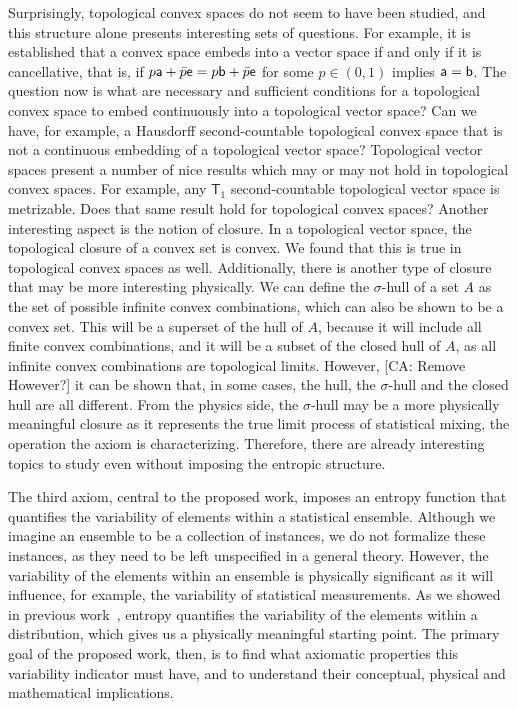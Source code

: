 Surprisingly, topological convex spaces do not seem to have been studied, and this structure alone presents interesting sets of questions.  For example, it is established that a convex space embeds into a vector space if and only if it is cancellative, that is, if $p \ens[a] + \bar{p} \ens = p \ens[b] + \bar{p} \ens$ for some $p \in (0,1)$ implies $\ens[a] = \ens[b]$. The question now is what are necessary and sufficient conditions for a topological convex space to embed continuously into a topological vector space? Can we have, for example, a Hausdorff second-countable topological convex space that is not a continuous embedding of a topological vector space? Topological vector spaces present a number of nice results which may or may not hold in topological convex spaces. For example, any $\mathsf{T}_1$ second-countable topological vector space is metrizable. Does that same result hold for topological convex spaces? Another interesting aspect is the notion of closure. In a topological vector space, the topological closure of a convex set is convex. We found that this is true in topological convex spaces as well. Additionally, there is another type of closure that may be more interesting physically. We can define the $\sigma$-hull of a set $A$ as the set of possible infinite convex combinations, which can also be shown to be a convex set. This will be a superset of the hull of $A$, because it will include all finite convex combinations, and it will be a subset of the closed hull of $A$, as all infinite convex combinations are topological limits. However, [CA: Remove However?] it can be shown that, in some cases, the hull, the $\sigma$-hull and the closed hull are all different. From the physics side, the $\sigma$-hull may be a more physically meaningful closure as it represents the true limit process of statistical mixing, the operation the axiom is characterizing. Therefore, there are already interesting topics to study even without imposing the entropic structure.

The third axiom, central to the proposed work, imposes an entropy function that quantifies the variability of elements within a statistical ensemble. Although we imagine an ensemble to be a collection of instances, we do not formalize these instances, as they need to be left unspecified in a general theory. However, the variability of the elements within an ensemble is physically significant as it will influence, for example, the variability of statistical measurements. As we showed in previous work~\cite{Carcassi:2021}, entropy quantifies the variability of the elements within a distribution, which gives us a physically meaningful starting point. The primary goal of the proposed work, then, is to find what axiomatic properties this variability indicator must have, and to understand their conceptual, physical and mathematical implications.

